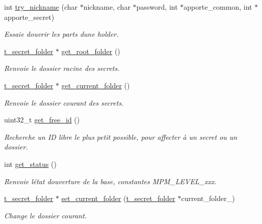 \begin{DoxyCompactItemize}
int \hyperlink{classt__database_aa0838d708635fd5edf94ecfc15b31d0c}{try\+\_\+nickname} (char $\ast$nickname, char $\ast$password, int $\ast$apporte\+\_\+common, int $\ast$apporte\+\_\+secret)
\begin{DoxyCompactList}\small\item\em Essaie d\textquotesingle{}ouvrir les parts d\textquotesingle{}une holder. \end{DoxyCompactList}\item 
\hyperlink{classt__secret__folder}{t\+\_\+secret\+\_\+folder} $\ast$ \hyperlink{classt__database_a53053bb8dc905324186817c5318288bb}{get\+\_\+root\+\_\+folder} ()
\begin{DoxyCompactList}\small\item\em Renvoie le dossier racine des secrets. \end{DoxyCompactList}\item 
\mbox{\label{classt__database_a0abd0979e6432bc27e7fd2a37e2a49d4}} 
\hyperlink{classt__secret__folder}{t\+\_\+secret\+\_\+folder} $\ast$ \hyperlink{classt__database_a0abd0979e6432bc27e7fd2a37e2a49d4}{get\+\_\+current\+\_\+folder} ()
\begin{DoxyCompactList}\small\item\em Renvoie le dossier courant des secrets. \end{DoxyCompactList}\item 
uint32\+\_\+t \hyperlink{classt__database_a093ddfc300f1f065f25447d41373d6a4}{get\+\_\+free\+\_\+id} ()
\begin{DoxyCompactList}\small\item\em Recherche un ID libre le plus petit possible, pour affecter à un secret ou un dossier. \end{DoxyCompactList}\item 
\mbox{\label{classt__database_a743be585915d1665983ae70f34cf8eb6}} 
int \hyperlink{classt__database_a743be585915d1665983ae70f34cf8eb6}{get\+\_\+status} ()
\begin{DoxyCompactList}\small\item\em Renvoie l\textquotesingle{}état d\textquotesingle{}ouverture de la base, constantes M\+P\+M\+\_\+\+L\+E\+V\+E\+L\+\_\+xxx. \end{DoxyCompactList}\item 
\hyperlink{classt__secret__folder}{t\+\_\+secret\+\_\+folder} $\ast$ \hyperlink{classt__database_a754f4bf1a2ca3f3676d31ee818302353}{set\+\_\+current\+\_\+folder} (\hyperlink{classt__secret__folder}{t\+\_\+secret\+\_\+folder} $\ast$current\+\_\+folder\+\_\+)
\begin{DoxyCompactList}\small\item\em Change le dossier courant. \end{DoxyCompactList}\end{DoxyCompactItemize}
